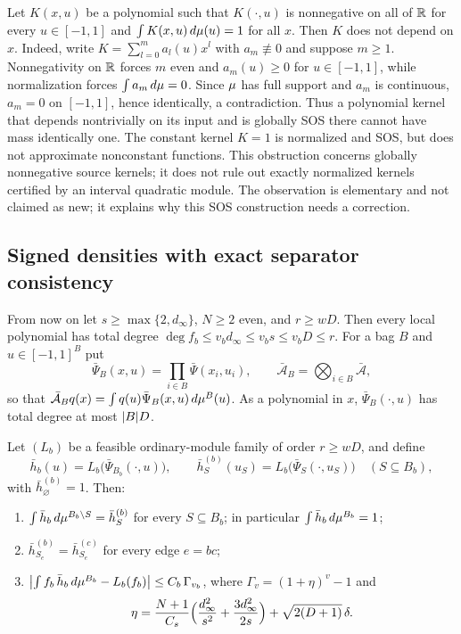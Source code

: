 \begin{remark}
\label{rem:normalization-obstruction}
Let $K(x,u)$ be a polynomial such that $K(\cdot,u)$ is nonnegative on all
of $\mathbb{R}$ for every $u\in[-1,1]$ and $\int K(x,u)\,d\mu(u)=1$ for all $x$.
Then $K$ does not depend on $x$. Indeed, write
$K=\sum_{l=0}^ma_l(u)x^l$ with $a_m\not\equiv0$ and suppose $m\ge1$.
Nonnegativity on $\mathbb{R}$ forces $m$ even and $a_m(u)\ge0$ for $u\in[-1,1]$,
while normalization forces $\int a_m\,d\mu=0$. Since $\mu$ has full
support and $a_m$ is continuous, $a_m=0$ on $[-1,1]$, hence identically,
a contradiction. Thus a polynomial kernel that depends nontrivially on
its input and is globally SOS there cannot have mass identically one.
The constant kernel $K=1$ is normalized and SOS, but does not approximate
nonconstant functions. This obstruction concerns globally nonnegative
source kernels; it does not rule out exactly normalized kernels certified
by an interval quadratic module. The observation is elementary and not
claimed as new; it explains why this SOS construction needs a correction.
\end{remark}

\subsection{Signed densities with exact separator consistency}
\label{sec:mod-signed}

From now on let $s\ge\max\{2,d_\infty\}$, $N\ge2$ even, and
$r\ge wD$. Then every local polynomial has total degree
$\deg f_b\le v_bd_\infty\le v_bs\le v_bD\le r$. For a bag $B$ and
$u\in[-1,1]^B$ put
\[
  \bar\Psi_B(x,u)=\prod_{i\in B}\bar\Psi(x_i,u_i),\qquad
  \bar{\mathcal A}_B=\bigotimes_{i\in B}\bar{\mathcal A},
\]
so that $\bar{\mathcal A}_Bq(x)=\int q(u)\bar\Psi_B(x,u)\,d\mu^B(u)$. As a
polynomial in $x$, $\bar\Psi_B(\cdot,u)$ has total degree at most
$\lvert B\rvert D$.

\begin{lemma}\label{lem:mod-signed}
Let $(L_b)$ be a feasible ordinary-module family of order $r\ge wD$, and
define
\[
  \bar h_b(u)=L_b\bigl(\bar\Psi_{B_b}(\cdot,u)\bigr),\qquad
  \bar h^{(b)}_S(u_S)=L_b\bigl(\bar\Psi_S(\cdot,u_S)\bigr)\quad
  (S\subseteq B_b),
\]
with $\bar h^{(b)}_\varnothing=1$. Then:
\begin{enumerate}[label=(\alph*)]
\item $\int\bar h_b\,d\mu^{B_b\setminus S}=\bar h^{(b)}_S$ for every
  $S\subseteq B_b$; in particular $\int\bar h_b\,d\mu^{B_b}=1$;
\item $\bar h^{(b)}_{S_e}=\bar h^{(c)}_{S_e}$ for every edge $e=bc$;
\item $\bigl\lvert\int f_b\,\bar h_b\,d\mu^{B_b}-L_b(f_b)\bigr\rvert\le
  C_b\,\Gamma_{v_b}$, where $\Gamma_v=(1+\eta)^v-1$ and
  \begin{equation}\label{eq:mod-eta}
    \eta=\frac{N+1}{C_s}\Bigl(\frac{d_\infty^2}{s^2}
    +\frac{3d_\infty^2}{2s}\Bigr)+\sqrt{2(D+1)}\,\delta .
  \end{equation}
\end{enumerate}
\end{lemma}

